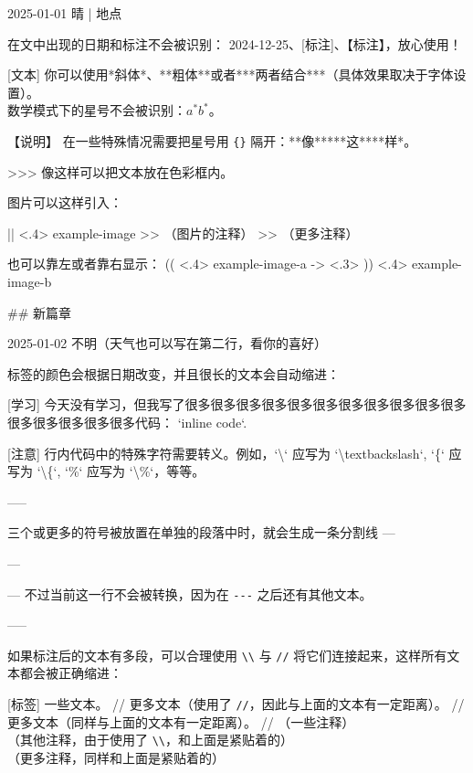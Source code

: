 \documentclass[11pt, paperstyle=light yellow, color entry,
  title in boldface, title in sffamily, use style = classical]{jwjournal}
\begin{document}
2025-01-01 晴 | 地点

  在文中出现的日期和标注不会被识别： 2024-12-25、[标注]、【标注】，放心使用！

  [文本]
    你可以使用*斜体*、**粗体**或者***两者结合***（具体效果取决于字体设置）。
    \\
    数学模式下的星号不会被识别：$a^* b^*$。

  【说明】 %
    在一些特殊情况需要把星号用 \texttt{\{\}} 隔开：**像**{}***这***{}*样*。

  >>> 像这样可以把文本放在色彩框内。

  图片可以这样引入：

  || <.4> {example-image} %
  >> （图片的注释）
  >> （更多注释）

  也可以靠左或者靠右显示：
  (( <.4> {example-image-a} %
  -> <.3> %
  )) <.4> {example-image-b} %


## {新篇章}

2025-01-02
不明（天气也可以写在第二行，看你的喜好）

  标签的颜色会根据日期改变，并且很长的文本会自动缩进：

  [学习] 今天没有学习，但我写了很多很多很多很多很多很多很多很多很多很多很多很多很多很多很多很多代码： `inline code`.

  [注意] 行内代码中的特殊字符需要转义。例如，`\textbackslash` 应写为 `\textbackslash textbackslash`, `\{` 应写为 `\textbackslash\{`, `\%` 应写为 `\textbackslash\%`，等等。

  -----

  三个或更多的\textquote{\texttt{-}}符号被放置在单独的段落中时，就会生成一条分割线 ---

  ---

  --- 不过当前这一行不会被转换，因为在 \texttt{-}\texttt{-}\texttt{-} 之后还有其他文本。

  -----

  如果标注后的文本有多段，可以合理使用 \texttt{\textbackslash\textbackslash} 与 \texttt{\slash\slash} 将它们连接起来，这样所有文本都会被正确缩进：

  [标签] 一些文本。
    //
    更多文本（使用了 \texttt{\slash\slash}，因此与上面的文本有一定距离）。
    //
    更多文本（同样与上面的文本有一定距离）。
    //
    （一些注释）
    \\
    （其他注释，由于使用了 \texttt{\textbackslash\textbackslash}，和上面是紧贴着的）
    \\
    （更多注释，同样和上面是紧贴着的）
\end{document}
